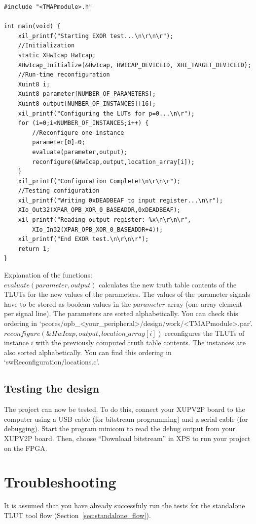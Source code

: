 \documentclass[a4paper,oneside]{memoir}
\begin{document}
\lstset{language=[ansi]C,showstringspaces=false}
\begin{lstlisting}
#include "<TMAPmodule>.h"

int main(void) {
	xil_printf("Starting EXOR test...\n\r\n\r");
	//Initialization
	static XHwIcap HwIcap;
	XHwIcap_Initialize(&HwIcap, HWICAP_DEVICEID, XHI_TARGET_DEVICEID);
	//Run-time reconfiguration
	Xuint8 i;
	Xuint8 parameter[NUMBER_OF_PARAMETERS];
	Xuint8 output[NUMBER_OF_INSTANCES][16];
	xil_printf("Configuring the LUTs for p=0...\n\r");
	for (i=0;i<NUMBER_OF_INSTANCES;i++) {
		//Reconfigure one instance
		parameter[0]=0;
		evaluate(parameter,output);
		reconfigure(&HwIcap,output,location_array[i]);
	}
	xil_printf("Configuration Complete!\n\r\n\r");
	//Testing configuration
	xil_printf("Writing 0xDEADBEAF to input register...\n\r");
	XIo_Out32(XPAR_OPB_XOR_0_BASEADDR,0xDEADBEAF);
	xil_printf("Reading output register: %x\n\r\n\r", 
		XIo_In32(XPAR_OPB_XOR_0_BASEADDR+4));
	xil_printf("End EXOR test.\n\r\n\r");
	return 1;
}
\end{lstlisting}

Explanation of the functions:\\
$evaluate(parameter, output)$ calculates the new truth table contents of the TLUTs for the new values of the parameters. The  values of the parameter signals have to be stored as boolean values in the $parameter$ array (one array element per signal line). The parameters are sorted alphabetically. You can check this ordering in `pcores/opb\_<your\_peripheral>/design/work/<TMAPmodule>.par'.\\
$reconfigure(\&HwIcap, output, location\_array[i])$ reconfigures the TLUTs of instance $i$ with the previously computed truth table contents. The instances are also sorted alphabetically. You can find this ordering in `swReconfiguration/locations.c'.


\subsection{Testing the design}\label{sec:testing}
The project can now be tested. To do this, connect your XUPV2P board to the computer using a USB cable (for bitstream programming) and a serial cable (for debugging). Start the program minicom to read the debug output from your XUPV2P board. Then, choose ``Download bitstream'' in XPS to run your project on the FPGA.


\section{Troubleshooting}\label{sec:xilinx_troubleshooting}
It is assumed that you have already successfuly run the tests for the standalone TLUT tool flow (Section~\ref{sec:standalone_flow}).
\end{document}
